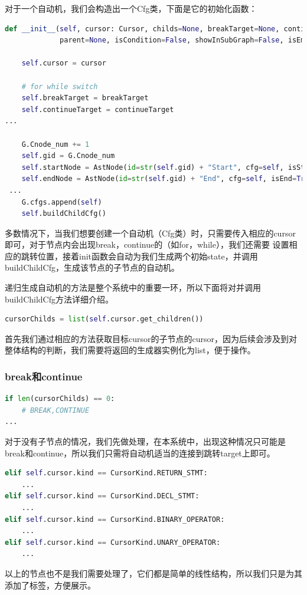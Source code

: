 对于一个自动机，我们会构造出一个Cfg类，下面是它的初始化函数：
{\small
\begin{lstlisting}[language=Python,caption=init]
def __init__(self, cursor: Cursor, childs=None, breakTarget=None, continueTarget=None, returnTarget=None,
             parent=None, isCondition=False, showInSubGraph=False, isEmpty=False, label=None):

    self.cursor = cursor

    # for while switch
    self.breakTarget = breakTarget
    self.continueTarget = continueTarget
...

    G.Cnode_num += 1
    self.gid = G.Cnode_num
    self.startNode = AstNode(id=str(self.gid) + "Start", cfg=self, isStart=True)
    self.endNode = AstNode(id=str(self.gid) + "End", cfg=self, isEnd=True)
 ...
    G.cfgs.append(self)
    self.buildChildCfg()
\end{lstlisting}
}
多数情况下，当我们想要创建一个自动机（Cfg类）时，只需要传入相应的cursor即可，对于节点内会出现break，continue的（如for，while），我们还需要
设置相应的跳转位置，接着init函数会自动为我们生成两个初始state，并调用buildChildCfg，生成该节点的子节点的自动机。

递归生成自动机的方法是整个系统中的重要一环，所以下面将对并调用buildChildCfg方法详细介绍。
\\
{\small
\begin{lstlisting}[language=Python]
cursorChilds = list(self.cursor.get_children())
\end{lstlisting}
}
首先我们通过相应的方法获取目标cursor的子节点的cursor，因为后续会涉及到对整体结构的判断，我们需要将返回的生成器实例化为list，便于操作。
\\
\subsubsection{break和continue}
{\small
\begin{lstlisting}[language=Python]
if len(cursorChilds) == 0:
    # BREAK,CONTINUE
...
\end{lstlisting}
}
对于没有子节点的情况，我们先做处理，在本系统中，出现这种情况只可能是break和continue，所以我们只需将自动机适当的连接到跳转target上即可。
\\
{\small
\begin{lstlisting}[language=Python]
elif self.cursor.kind == CursorKind.RETURN_STMT:
    ...
elif self.cursor.kind == CursorKind.DECL_STMT:
    ...
elif self.cursor.kind == CursorKind.BINARY_OPERATOR:
    ...
elif self.cursor.kind == CursorKind.UNARY_OPERATOR:
    ...
\end{lstlisting}
}
以上的节点也不是我们需要处理了，它们都是简单的线性结构，所以我们只是为其添加了标签，方便展示。

